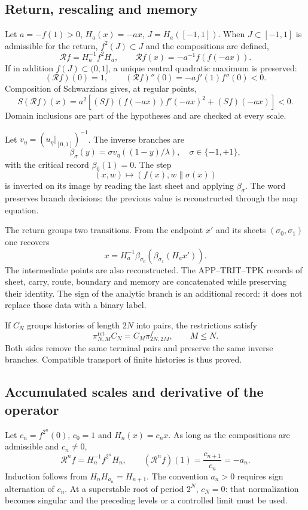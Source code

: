 \subsection{Return, rescaling and memory}
\label{hmtfg:desarrollo:5}

Let \(a=-f(1)>0\), \(H_a(x)=-ax\), \(J=H_a([-1,1])\). When \(J\subset[-1,1]\) is admissible for the return, \(f^2(J)\subset J\) and the compositions are defined,
\[
\mathcal Rf=H_a^{-1}f^2H_a,\qquad
\mathcal Rf(x)=-a^{-1}f(f(-ax)).
\]
If in addition \(f(J)\subset(0,1]\), a unique central quadratic maximum is preserved:
\[
(\mathcal Rf)(0)=1,\qquad
(\mathcal Rf)''(0)=-a f'(1)f''(0)<0.
\]
Composition of Schwarzians gives, at regular points,
\[
S(\mathcal Rf)(x)=a^2
\left[(Sf)(f(-ax))f'(-ax)^2+(Sf)(-ax)\right]<0.
\]
Domain inclusions are part of the hypotheses and are checked at every scale.

Let \(v_\eta=(u_\eta|_{[0,1]})^{-1}\). The inverse branches are
\[
\beta_\sigma(y)=\sigma v_\eta((1-y)/\lambda),\quad
\sigma\in\{-1,+1\},
\]
with the critical record \(\beta_0(1)=0\). The step
\[
(x,w)\longmapsto(f(x),w\mathbin{\|}\sigma(x))
\]
is inverted on its image by reading the last sheet and applying \(\beta_\sigma\). The word preserves branch decisions; the previous value is reconstructed through the map equation.

The return groups two transitions. From the endpoint \(x'\) and its sheets \((\sigma_0,\sigma_1)\) one recovers
\[
x=H_a^{-1}\beta_{\sigma_0}
\!\left(\beta_{\sigma_1}(H_ax')\right).
\]
The intermediate points are also reconstructed. The APP–TRIT–TPK records of sheet, carry, route, boundary and memory are concatenated while preserving their identity. The sign of the analytic branch is an additional record: it does not replace those data with a binary label.

If \(C_N\) groups histories of length \(2N\) into pairs, the restrictions satisfy
\[
\pi^{\mathrm{ret}}_{N,M}C_N
=C_M\pi^f_{2N,2M},\qquad M\le N.
\]
Both sides remove the same terminal pairs and preserve the same inverse branches. Compatible transport of finite histories is thus proved.


\subsection{Accumulated scales and derivative of the operator}
\label{hmtfg:desarrollo:6}

Let \(c_n=f^{2^n}(0)\), \(c_0=1\) and \(H_n(x)=c_nx\). As long as the compositions are admissible and \(c_n\ne0\),
\[
\boxed{\mathcal R^nf=H_n^{-1}f^{2^n}H_n},\qquad
(\mathcal R^nf)(1)=\frac{c_{n+1}}{c_n}=-a_n.
\]
Induction follows from \(H_nH_{a_n}=H_{n+1}\). The convention \(a_n>0\) requires sign alternation of \(c_n\). At a superstable root of period \(2^N\), \(c_N=0\): that normalization becomes singular and the preceding levels or a controlled limit must be used.

